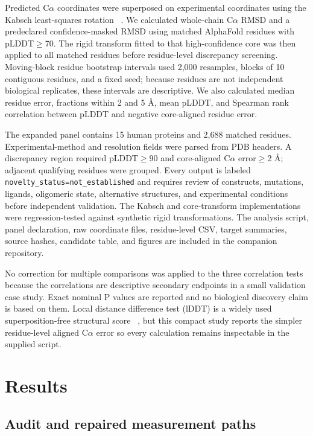 \documentclass[11pt]{article}
\begin{document}
Predicted C$\alpha$ coordinates were superposed on experimental coordinates using the Kabsch least-squares rotation ~\cite{ref8}. We calculated whole-chain C$\alpha$ RMSD and a predeclared confidence-masked RMSD using matched AlphaFold residues with pLDDT$\geq$70. The rigid transform fitted to that high-confidence core was then applied to all matched residues before residue-level discrepancy screening. Moving-block residue bootstrap intervals used 2,000 resamples, blocks of 10 contiguous residues, and a fixed seed; because residues are not independent biological replicates, these intervals are descriptive. We also calculated median residue error, fractions within 2 and 5 \AA{}, mean pLDDT, and Spearman rank correlation between pLDDT and negative core-aligned residue error.

The expanded panel contains 15 human proteins and 2,688 matched residues. Experimental-method and resolution fields were parsed from PDB headers. A discrepancy region required pLDDT$\geq$90 and core-aligned C$\alpha$ error$\geq$2 \AA{}; adjacent qualifying residues were grouped. Every output is labeled \nolinkurl{novelty_status=not_established} and requires review of constructs, mutations, ligands, oligomeric state, alternative structures, and experimental conditions before independent validation. The Kabsch and core-transform implementations were regression-tested against synthetic rigid transformations. The analysis script, panel declaration, raw coordinate files, residue-level CSV, target summaries, source hashes, candidate table, and figures are included in the companion repository.

No correction for multiple comparisons was applied to the three correlation tests because the correlations are descriptive secondary endpoints in a small validation case study. Exact nominal P values are reported and no biological discovery claim is based on them. Local distance difference test (lDDT) is a widely used superposition-free structural score ~\cite{ref9}, but this compact study reports the simpler residue-level aligned C$\alpha$ error so every calculation remains inspectable in the supplied script.

\section{Results}

\subsection{Audit and repaired measurement paths}
\end{document}
